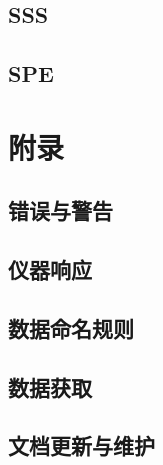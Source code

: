 \chapter{SSS}





















\chapter{SPE}












\part{附录}
\appendix
\chapter{错误与警告}







\chapter{仪器响应}
\label{chap:resp}




\chapter{数据命名规则}
\label{chap:naming}


\chapter{数据获取}




\chapter{文档更新与维护}
\label{chap:doc-maintenance}








